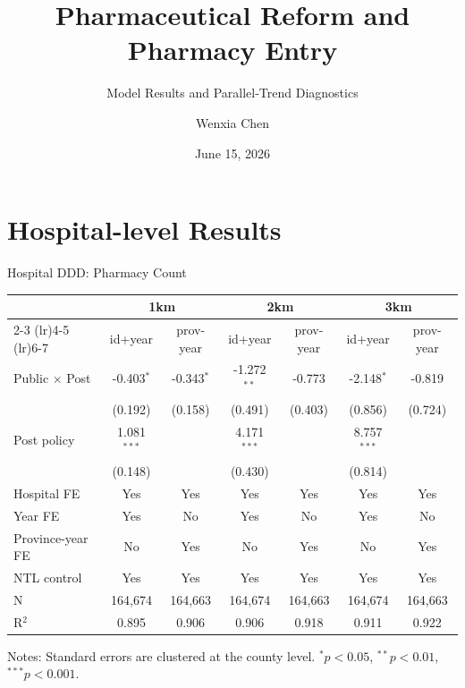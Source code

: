 \documentclass{beamer}
\title{Pharmaceutical Reform and Pharmacy Entry}
\subtitle{Model Results and Parallel-Trend Diagnostics}
\author{Wenxia Chen}
\date{June 15, 2026}
\begin{document}
\frame{\titlepage}


\section{Hospital-level Results}

\begin{frame}{Hospital DDD: Pharmacy Count}

\centering
\scriptsize
\setlength{\tabcolsep}{3pt}

\begin{tabular}{lcccccc}
\toprule
& \multicolumn{2}{c}{1km} & \multicolumn{2}{c}{2km} & \multicolumn{2}{c}{3km} \\
\cmidrule(lr){2-3} \cmidrule(lr){4-5} \cmidrule(lr){6-7}
& id+year & prov-year & id+year & prov-year & id+year & prov-year \\
\midrule
Public $\times$ Post
& -0.403$^{*}$ & -0.343$^{*}$
& -1.272$^{**}$ & -0.773
& -2.148$^{*}$ & -0.819 \\
& (0.192) & (0.158)
& (0.491) & (0.403)
& (0.856) & (0.724) \\
\addlinespace
Post policy
& 1.081$^{***}$ & 
& 4.171$^{***}$ &
& 8.757$^{***}$ & \\
& (0.148) &
& (0.430) &
& (0.814) & \\
\midrule
Hospital FE & Yes & Yes & Yes & Yes & Yes & Yes \\
Year FE & Yes & No & Yes & No & Yes & No \\
Province-year FE & No & Yes & No & Yes & No & Yes \\
NTL control & Yes & Yes & Yes & Yes & Yes & Yes \\
\midrule
N & 164,674 & 164,663 & 164,674 & 164,663 & 164,674 & 164,663 \\
R$^2$ & 0.895 & 0.906 & 0.906 & 0.918 & 0.911 & 0.922 \\
\bottomrule
\end{tabular}

\vspace{0.4em}
\raggedright
\tiny Notes: Standard errors are clustered at the county level. $^{*}p<0.05$, $^{**}p<0.01$, $^{***}p<0.001$.

\end{frame}
\end{document}
